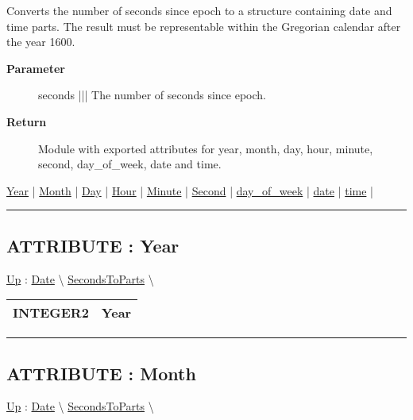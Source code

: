 \par
Converts the number of seconds since epoch to a structure containing date and time parts. The result must be representable within the Gregorian calendar after the year 1600.

\par
\begin{description}
\item [\textbf{Parameter}] seconds ||| The number of seconds since epoch.
\item [\textbf{Return}] Module with exported attributes for year, month, day, hour, minute, second, day\_of\_week, date and time.
\end{description}

\hyperlink{ecldoc:date.secondstoparts.result.year}{Year}  |
\hyperlink{ecldoc:date.secondstoparts.result.month}{Month}  |
\hyperlink{ecldoc:date.secondstoparts.result.day}{Day}  |
\hyperlink{ecldoc:date.secondstoparts.result.hour}{Hour}  |
\hyperlink{ecldoc:date.secondstoparts.result.minute}{Minute}  |
\hyperlink{ecldoc:date.secondstoparts.result.second}{Second}  |
\hyperlink{ecldoc:date.secondstoparts.result.day_of_week}{day\_of\_week}  |
\hyperlink{ecldoc:date.secondstoparts.result.date}{date}  |
\hyperlink{ecldoc:date.secondstoparts.result.time}{time}  |

\rule{\linewidth}{0.5pt}

\subsection*{ATTRIBUTE : Year}
\hypertarget{ecldoc:date.secondstoparts.result.year}{}
\hyperlink{ecldoc:date.secondstoparts}{Up} :
\hspace{0pt} \hyperlink{ecldoc:Date}{Date} \textbackslash 
\hspace{0pt} \hyperlink{ecldoc:date.secondstoparts}{SecondsToParts} \textbackslash 

{\renewcommand{\arraystretch}{1.5}
\begin{tabularx}{\textwidth}{|>{\raggedright\arraybackslash}l|X|}
\hline
\hspace{0pt}INTEGER2 & Year \\
\hline
\end{tabularx}
}

\par


\rule{\linewidth}{0.5pt}
\subsection*{ATTRIBUTE : Month}
\hypertarget{ecldoc:date.secondstoparts.result.month}{}
\hyperlink{ecldoc:date.secondstoparts}{Up} :
\hspace{0pt} \hyperlink{ecldoc:Date}{Date} \textbackslash 
\hspace{0pt} \hyperlink{ecldoc:date.secondstoparts}{SecondsToParts} \textbackslash 

